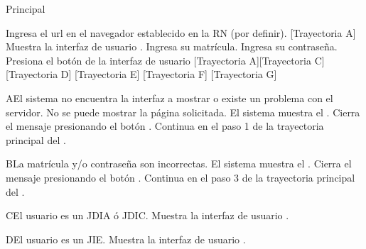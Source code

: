 \begin{UCtrayectoria}{Principal}
    
    \UCpaso[\UCactor] Ingresa el url en el navegador establecido en la RN (por definir). [Trayectoria A] 
    \UCpaso Muestra la interfaz de usuario .
    \UCpaso[\UCactor] Ingresa su matrícula.
    \UCpaso[\UCactor] Ingresa su contraseña.
    \UCpaso[\UCactor] Presiona el botón  de la interfaz de usuario   [Trayectoria A][Trayectoria C] [Trayectoria D] [Trayectoria E] [Trayectoria F] [Trayectoria G]
\end{UCtrayectoria}


\begin{UCtrayectoriaA}{A}{El sistema no encuentra la interfaz a mostrar o existe un problema con el servidor.}
    \UCpaso No se puede mostrar la página solicitada.
    \UCpaso El sistema muestra el .
    \UCpaso[\UCactor] Cierra el mensaje presionando el botón .
    \UCpaso Continua en el paso 1 de la trayectoria principal del .
\end{UCtrayectoriaA}


\begin{UCtrayectoriaA}{B}{La matrícula y/o contraseña son incorrectas.}
    \UCpaso El sistema muestra el  .
    \UCpaso[\UCactor] Cierra el mensaje presionando el botón .
    \UCpaso Continua en el paso 3 de la trayectoria principal del .
\end{UCtrayectoriaA}



\begin{UCtrayectoriaA}{C}{El usuario es un JDIA ó JDIC.}
    \UCpaso Muestra la interfaz de usuario .
\end{UCtrayectoriaA}


\begin{UCtrayectoriaA}{D}{El usuario es un JIE.}
    \UCpaso Muestra la interfaz de usuario .
\end{UCtrayectoriaA}


